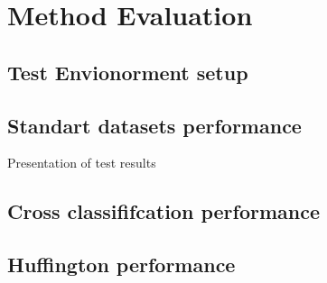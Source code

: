 \chapter{Method Evaluation}

\section{ Test Envionorment setup }

\section{ Standart datasets performance}
Presentation of test results



\section{ Cross classififcation performance}

\section{ Huffington performance }

